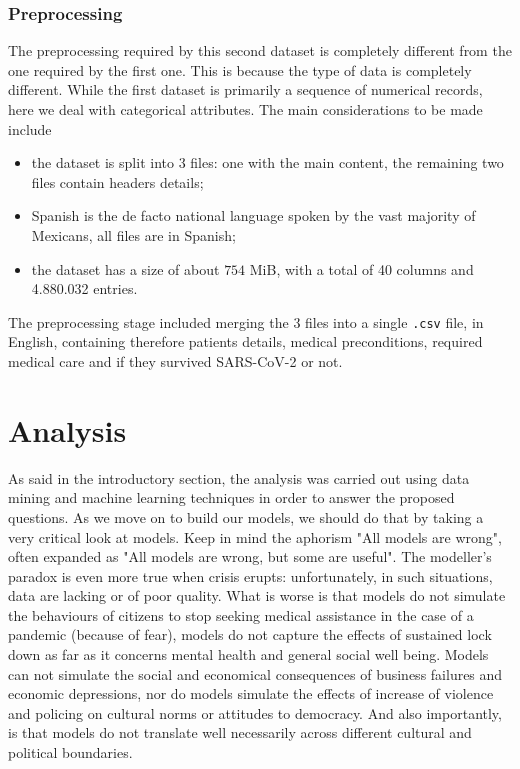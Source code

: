 \documentclass[11pt,a4paper]{article}
\begin{document}
\subsubsection{Preprocessing}
The preprocessing required by this second dataset is completely different from
the one required  by the first one. This is because the type of data is
completely different. While the first dataset is primarily a sequence of
numerical records, here we deal with categorical attributes. The main
considerations to be made include
\begin{itemize}
    \item the dataset is split into $3$ files: one with the main content, the
    remaining two files contain headers details;
    \item Spanish is the de facto national language spoken by the vast majority
    of Mexicans, all files are in Spanish;
    \item the dataset has a size of about $754$ MiB, with a total of 40 columns
    and 4.880.032 entries.
\end{itemize}
The preprocessing stage included merging the 3 files into a single \texttt{.csv}
file, in English, containing therefore patients details, medical preconditions,
required medical care and if they survived SARS-CoV-2 or not.

\newpage
\section{Analysis}
As said in the introductory section, the analysis was carried out using data
mining and machine learning techniques in order to answer the proposed
questions. As we move on to build our models, we should do that by taking a very
critical look at models. Keep in mind the aphorism "All models are wrong", often
expanded as "All models are wrong, but some are useful". The modeller's paradox
is even more true when crisis erupts: unfortunately, in such situations, data
are lacking or of poor quality. What is worse is that models do not simulate the
behaviours of citizens to stop seeking medical assistance in the case of a
pandemic (because of fear), models do not capture the effects of sustained lock
down as far as it concerns mental health and general social well being. Models
can not simulate the social and economical consequences of business failures and
economic depressions, nor do models simulate the effects of increase of violence
and policing on cultural norms or attitudes to democracy. And also importantly,
is that models do not translate well necessarily across different cultural and
political boundaries.
\end{document}
